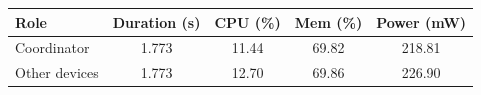 \begin{tabular}{lcccc}
\hline
\textbf{Role} & \textbf{Duration (s)} & \textbf{CPU (\%)} & \textbf{Mem (\%)} & \textbf{Power (mW)} \\
\hline
Coordinator & 1.773 & 11.44 & 69.82 & 218.81 \\
Other devices & 1.773 & 12.70 & 69.86 & 226.90 \\
\hline
\end{tabular}
